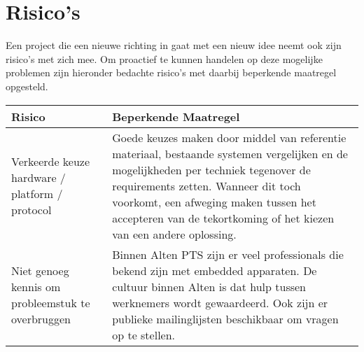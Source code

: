 \section{Risico's}

Een project die een nieuwe richting in gaat met een nieuw idee neemt ook zijn risico's met zich mee. Om proactief te kunnen handelen op deze mogelijke problemen zijn hieronder bedachte risico's met daarbij beperkende maatregel opgesteld.

\begin{center}
\begin{tabular}{| p{5cm}| p{9cm}|}
\hline
{\bf Risico} & {\bf Beperkende Maatregel}\\
\hline

Verkeerde keuze hardware / platform / protocol & Goede keuzes maken door middel van referentie materiaal, bestaande systemen vergelijken en de mogelijkheden per techniek tegenover de requirements zetten. Wanneer dit toch voorkomt, een afweging maken tussen het accepteren van de tekortkoming of het kiezen van een andere oplossing.\\
\hline
Niet genoeg kennis om probleemstuk te overbruggen & Binnen Alten PTS zijn er veel professionals die bekend zijn met embedded apparaten. De cultuur binnen Alten is dat hulp tussen werknemers wordt gewaardeerd. Ook zijn er publieke mailinglijsten beschikbaar om vragen op te stellen.\\
\hline

\end{tabular}
\end{center}


